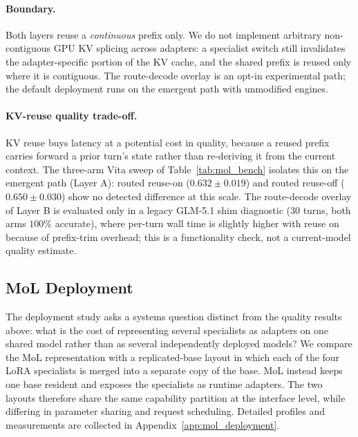 \paragraph{Boundary.}
Both layers reuse a \emph{continuous} prefix only. We do not implement arbitrary non-contiguous GPU KV splicing across adapters: a specialist switch still invalidates the adapter-specific portion of the KV cache, and the shared prefix is reused only where it is contiguous. The route-decode overlay is an opt-in experimental path; the default deployment runs on the emergent path with unmodified engines.

\paragraph{KV-reuse quality trade-off.}
KV reuse buys latency at a potential cost in quality, because a reused prefix carries forward a prior turn's state rather than re-deriving it from the current context. The three-arm Vita sweep of Table~\ref{tab:mol_bench} isolates this on the emergent path (Layer A): routed reuse-on ($0.632 \pm 0.019$) and routed reuse-off ($0.650 \pm 0.030$) show no detected difference at this scale. The route-decode overlay of Layer B is evaluated only in a legacy GLM-5.1 shim diagnostic (30 turns, both arms $100\%$ accurate), where per-turn wall time is slightly higher with reuse on because of prefix-trim overhead; this is a functionality check, not a current-model quality estimate.

\subsection{MoL Deployment}
\label{sec:mol_deployment}

The deployment study asks a systems question distinct from the quality results
above: what is the cost of representing several specialists as adapters on one
shared model rather than as several independently deployed models? We compare
the MoL representation with a replicated-base layout in which each of the four
LoRA specialists is merged into a separate copy of the base. MoL instead keeps
one base resident and exposes the specialists as runtime adapters. The two
layouts therefore share the same capability partition at the interface level,
while differing in parameter sharing and request scheduling. Detailed profiles
and measurements are collected in Appendix~\ref{app:mol_deployment}.


